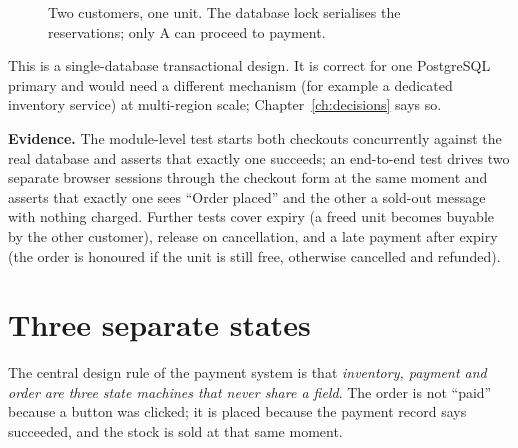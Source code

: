 \begin{figure}[H]
\centering
{}
\caption{Two customers, one unit. The database lock serialises the reservations; only A can proceed to payment.}
\label{fig:race}
\end{figure}

This is a single-database transactional design. It is correct for one PostgreSQL primary and would need a different mechanism (for example a dedicated inventory service) at multi-region scale; Chapter~\ref{ch:decisions} says so.

\textbf{Evidence.} The module-level test starts both checkouts concurrently against the real database and asserts that exactly one succeeds; an end-to-end test drives two separate browser sessions through the checkout form at the same moment and asserts that exactly one sees ``Order placed'' and the other a sold-out message with nothing charged. Further tests cover expiry (a freed unit becomes buyable by the other customer), release on cancellation, and a late payment after expiry (the order is honoured if the unit is still free, otherwise cancelled and refunded). \tagtest{}

\section{Three separate states}

The central design rule of the payment system is that \emph{inventory, payment and order are three state machines that never share a field}. The order is not ``paid'' because a button was clicked; it is placed because the payment record says succeeded, and the stock is sold at that same moment.

